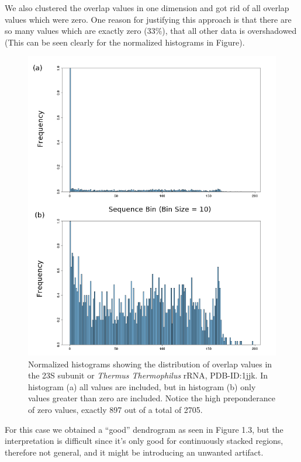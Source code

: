 We also clustered the overlap values in one dimension and got rid of
all overlap values which were zero. One reason for justifying this approach 
is that there are so many values which are exactly zero (33\%), that all other data
is overshadowed (This can be seen clearly for the normalized histograms in Figure).
\begin{figure}[htbp]
\centering 
\includegraphics[angle=0, scale=0.8]{Chapter1/histocompare.png}
\caption{Normalized histograms showing the distribution of overlap values in 
the 23S subunit or \textit{Thermus Thermophilus} rRNA, PDB-ID:1jjk. In histogram 
(a) all values are included, but in histogram (b) only values greater than zero are 
included. Notice the high preponderance of zero values, exactly 897 out of a total
of 2705.}
\end{figure}
For this case we obtained a ``good'' dendrogram as seen in Figure 1.3, but the interpretation is
difficult since it's only good for continuously stacked regions, therefore not
general, and it might be introducing an unwanted artifact.
